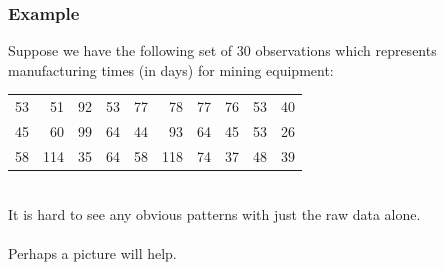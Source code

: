 \documentclass[xcolor=svgnames, compress]{beamer}
\begin{document}
\begin{frame} %
\frametitle{Example}

\justifying
Suppose we have the following set of 30 observations which represents manufacturing times (in days) for mining equipment:
\hfill\\

\begin{center}
\begin{tabular}{r r r r r r r r r r  }
53	& 	51	&	92	&	53	&	77	&	78	&	77	&	76	&	53	&	40	\\
45	&	60	&	99 	&	64 	&	44	&	93	&	64	&	45	&	53	&	26	\\
58	&	114	&	35	&	64	&	58	&	118	&	74	&	37	&	48	&	39	\\
\end{tabular}
\end{center}
\hfill\\
\justifying
It is hard to see any obvious patterns with just the \alert{raw data} alone.\\
\hfill\\
\justifying
Perhaps a picture will help.

\end{frame}
\end{document}
